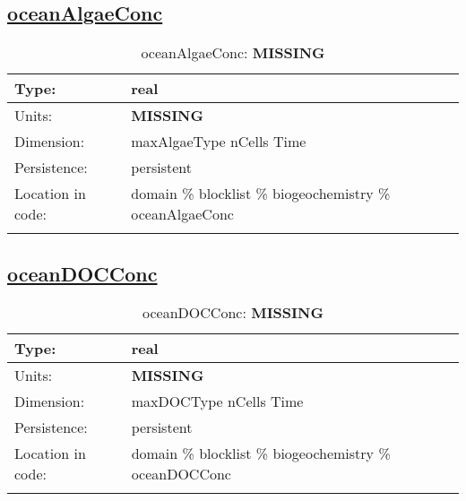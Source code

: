 \subsection[oceanAlgaeConc]{\hyperref[sec:var_tab_biogeochemistry]{oceanAlgaeConc}}
\label{subsec:var_sec_biogeochemistry_oceanAlgaeConc}
\begin{center}
\begin{longtable}{| p{2.0in} | p{4.0in} |}
        \hline 
        Type: & real \\
        \hline 
        Units: & {\bf \color{red} MISSING} \\
        \hline 
        Dimension: & maxAlgaeType nCells Time \\
        \hline 
        Persistence: & persistent \\
        \hline 
         Location in code: & domain \% blocklist \% biogeochemistry \% oceanAlgaeConc \\
         \hline 
    \caption{oceanAlgaeConc: {\bf \color{red} MISSING}}
\end{longtable}
\end{center}
\subsection[oceanDOCConc]{\hyperref[sec:var_tab_biogeochemistry]{oceanDOCConc}}
\label{subsec:var_sec_biogeochemistry_oceanDOCConc}
\begin{center}
\begin{longtable}{| p{2.0in} | p{4.0in} |}
        \hline 
        Type: & real \\
        \hline 
        Units: & {\bf \color{red} MISSING} \\
        \hline 
        Dimension: & maxDOCType nCells Time \\
        \hline 
        Persistence: & persistent \\
        \hline 
         Location in code: & domain \% blocklist \% biogeochemistry \% oceanDOCConc \\
         \hline 
    \caption{oceanDOCConc: {\bf \color{red} MISSING}}
\end{longtable}
\end{center}
